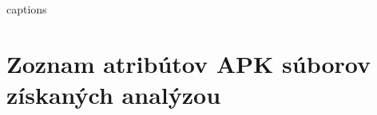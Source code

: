 %









	


{\csname captions\languagename\endcsname %
\makeatletter %
  \thesis@selectLocale{\thesis@locale}\makeatother
\printbibliography[heading=bibintoc]} %



\appendix %
\chapter{Zoznam atribútov APK súborov získaných analýzou}
%



